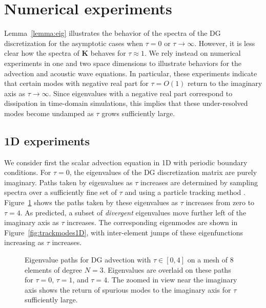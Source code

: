 \documentclass[preprint,10pt]{elsarticle}
\begin{document}
\section{Numerical experiments}

Lemma~\ref{lemma:eig} illustrates the behavior of the spectra of the DG discretization for the asymptotic cases when $\tau = 0$ or $\tau \rightarrow \infty$.  However, it is less clear how the spectra of $\bm{K}$ behaves for $\tau \approx 1$.  We rely instead on numerical experiments in one and two space dimensions to illustrate behaviors for the advection and acoustic wave equations.  In particular, these experiments indicate that certain modes with negative real part for $\tau = O(1)$ return to the imaginary axis as $\tau \rightarrow \infty$.  Since eigenvalues with a negative real part correspond to dissipation in time-domain simulations, this implies that these under-resolved modes become undamped as $\tau$ grows sufficiently large.  

\subsection{1D experiments}

We consider first the scalar advection equation in 1D with periodic boundary conditions.  For $\tau = 0$, the eigenvalues of the DG discretization matrix are purely imaginary.  Paths taken by eigenvalues as $\tau$ increases are determined by sampling spectra over a sufficiently fine set of $\tau$ and using a particle tracking method \cite{simpletracker}.  Figure~\ref{fig:track1D} shows the paths taken by these eigenvalues as $\tau$ increases from zero to $\tau = 4$.  As predicted, a subset of \emph{divergent} eigenvalues move further left of the imaginary axis as $\tau$ increases.  The corresponding eigenmodes are shown in Figure~\ref{fig:trackmodes1D}, with inter-element jumps of these eigenfunctions increasing as $\tau$ increases.  

\begin{figure}
\centering
{}
\hspace{1em}
\caption{Eigenvalue paths for DG advection with $\tau \in [0,4]$ on a mesh of 8 elements of degree $N=3$.  Eigenvalues are overlaid on these paths for $\tau = 0$, $\tau = 1$, and $\tau = 4$.  The zoomed in view near the imaginary axis shows the return of spurious modes to the imaginary axis for $\tau$ sufficiently large. }
\label{fig:track1D}
\end{figure}
\end{document}
